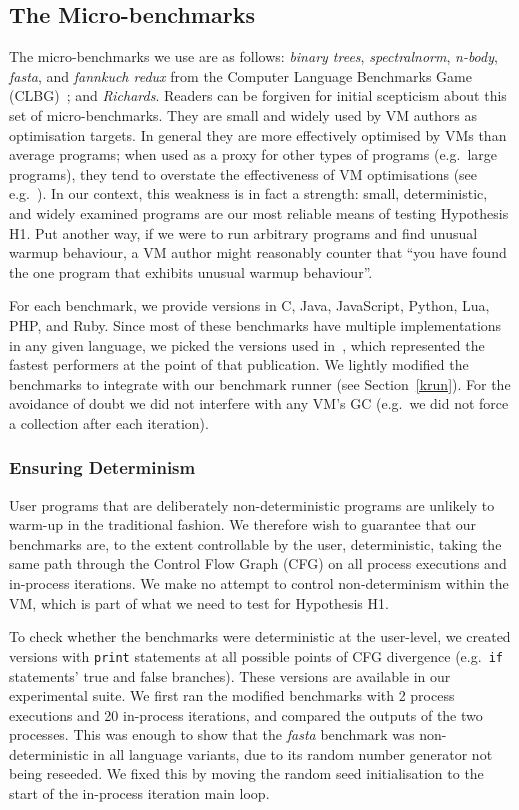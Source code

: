 \documentclass[acmlarge]{acmart}\settopmatter{printfolios=true}
\newcommand{\binarytrees}{\emph{binary trees}\xspace}
\newcommand{\richards}{\emph{Richards}\xspace}
\newcommand{\spectralnorm}{\emph{spectralnorm}\xspace}
\newcommand{\nbody}{\emph{n-body}\xspace}
\newcommand{\fasta}{\emph{fasta}\xspace}
\newcommand{\fannkuch}{\emph{fannkuch redux}\xspace}
\begin{document}
\subsection{The Micro-benchmarks}

The micro-benchmarks we use are as follows: \binarytrees, \spectralnorm, \nbody,
\fasta, and \fannkuch from the Computer Language Benchmarks Game (CLBG)~\cite{clbg}; and
\richards. Readers can be forgiven for initial scepticism about this set of micro-benchmarks.
They are small and widely
used by VM authors as optimisation targets. In general they are more effectively
optimised by VMs than average programs; when used as a proxy for other types
of programs (e.g.~large programs), they tend to overstate the effectiveness of
VM optimisations (see e.g.~\cite{ratanaworabhan09jsmeter}). In our context, this weakness is in fact a strength:
small, deterministic, and widely examined programs are our most
reliable means of testing Hypothesis H1. Put another way, if we were to run arbitrary programs
and find unusual warmup behaviour, a VM author might reasonably counter that
``you have found the one program that exhibits unusual warmup behaviour''.

For each benchmark, we provide versions in C, Java, JavaScript, Python, Lua, PHP,
and Ruby. Since most of these
benchmarks have multiple implementations in any given language, we picked
the versions used in~\cite{bolz14impact}, which represented the fastest
performers at the point of that publication. We lightly modified
the benchmarks to integrate with our benchmark runner (see Section~\ref{krun}).
For the avoidance of doubt we did not interfere with any VM's GC (e.g.~we did not
force a collection after each iteration).


\subsubsection{Ensuring Determinism}

User programs that are deliberately non-deterministic programs are unlikely to
warm-up in the traditional fashion.
We therefore wish to guarantee that our benchmarks are,
to the extent controllable by the user, deterministic, taking
the same path through the Control Flow Graph (CFG)
on all process executions and in-process iterations. We make no attempt to
control non-determinism within the VM, which is part of what we need to test for
Hypothesis H1.

To check whether the benchmarks were deterministic at the user-level, we created
versions with \texttt{print} statements at all possible points of CFG
divergence (e.g.~\texttt{if} statements' true and false branches).
These versions are available in our experimental suite. We first ran the modified
benchmarks with 2 process executions and 20 in-process iterations,
and compared the outputs of the two processes. This was enough to show that the
\fasta benchmark was non-deterministic
in all language variants, due to its random number generator not being reseeded. We
fixed this by moving the random seed initialisation to the start
of the in-process iteration main loop.
\end{document}
